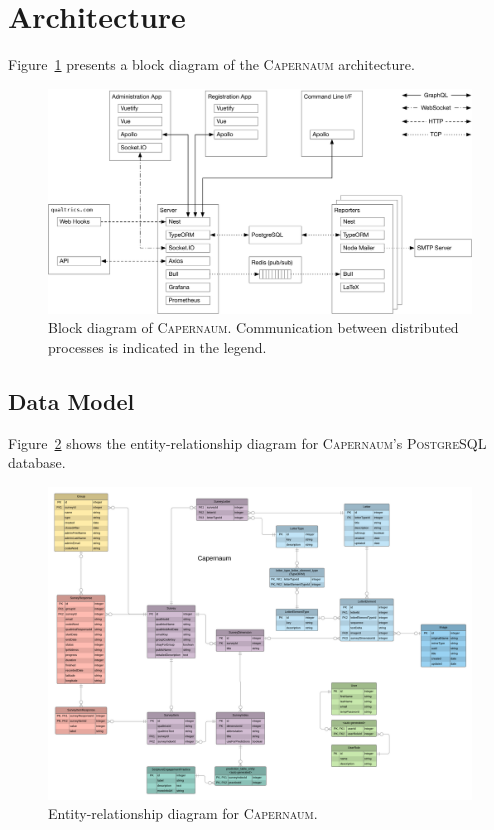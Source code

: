 \documentclass{article}
\newcommand{\caper}{\textsc{Capernaum}}
\newcommand{\pg}{\textsc{PostgreSQL}}
\begin{document}
\section{Architecture}
\label{sec:architecture}

Figure~\ref{fig:block-diagram}
presents a block diagram
of the \caper{} architecture.

\begin{figure}
  \centering
  \includegraphics[width=\textwidth]{block-diagram}
  \caption{Block diagram of \caper.
    Communication between distributed processes is indicated in the legend.}
  \label{fig:block-diagram}
\end{figure}

\subsection{Data Model}
\label{sec:data-model}

Figure~\ref{fig:erd} shows the entity-relationship diagram for \caper's \pg{} database.

\begin{figure}
  \centering
  \includegraphics[width=\textwidth]{data-model}
  \caption{Entity-relationship diagram for \caper.}
  \label{fig:erd}
\end{figure}
\end{document}
